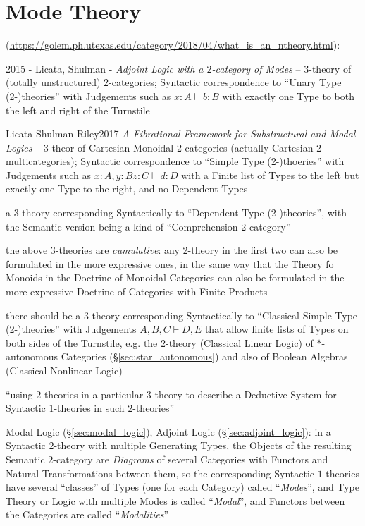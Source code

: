 {%
\section{Mode Theory}\label{sec:mode_theory}

(\url{https://golem.ph.utexas.edu/category/2018/04/what_is_an_ntheory.html}):

2015 - Licata, Shulman - \emph{Adjoint Logic with a $2$-category of Modes} --
$3$-theory of (totally unstructured) $2$-categories; Syntactic correspondence
to ``Unary Type (2-)theories'' with Judgements such as $x : A \vdash b : B$
with exactly one Type to both the left and right of the Turnstile

Licata-Shulman-Riley2017 \emph{A Fibrational Framework for
  Substructural and Modal Logics}
-- $3$-theor of Cartesian Monoidal $2$-categories (actually Cartesian
$2$-multicategories); Syntactic correspondence to ``Simple Type (2-)thoeries''
with Judgements such as $x : A, y : B z : C \vdash d : D$ with a Finite list of
Types to the left but exactly one Type to the right, and no Dependent Types

a $3$-theory corresponding Syntactically to ``Dependent Type (2-)theories'',
with the Semantic version being a kind of ``Comprehension 2-category''

the above $3$-theories are \emph{cumulative}: any 2-theory in the first two can
also be formulated in the more expressive ones, in the same way that the Theory
fo Monoids in the Doctrine of Monoidal Categories can also be formulated in the
more expressive Doctrine of Categories with Finite Products

there should be a $3$-theory corresponding Syntactically to ``Classical Simple
Type (2-)theories'' with Judgements $A,B,C \vdash D,E$ that allow finite lists
of Types on both sides of the Turnstile, e.g. the $2$-theory (Classical Linear
Logic) of $*$-autonomous Categories (\S\ref{sec:star_autonomous}) and also of
Boolean Algebras (Classical Nonlinear Logic)

``using $2$-theories in a particular $3$-theory to describe a Deductive System
for Syntactic $1$-theories in such $2$-theories''

Modal Logic (\S\ref{sec:modal_logic}), Adjoint Logic
(\S\ref{sec:adjoint_logic}): in a Syntactic $2$-theory with multiple Generating
Types, the Objects of the resulting Semantic $2$-category are \emph{Diagrams}
of several Categories with Functors and Natural Transformations between them,
so the corresponding Syntactic $1$-theories have several ``classes'' of Types
(one for each Category) called ``\emph{Modes}'', and Type Theory or Logic
with multiple Modes is called ``\emph{Modal}'', and Functors between the
Categories are called ``\emph{Modalities}''

}
